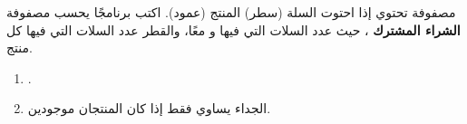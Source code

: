 \begin{statement}
مصفوفة  تحتوي  إذا احتوت السلة (سطر) المنتج (عمود). اكتب برنامجًا يحسب مصفوفة \textbf{الشراء المشترك} ، حيث  عدد السلات التي فيها  و معًا، والقطر عدد السلات التي فيها كل منتج.
\end{statement}
\begin{stepsbox}\begin{enumerate}
\item \par{\centering\small{}\par}.
\item الجداء يساوي  فقط إذا كان المنتجان موجودين.
\end{enumerate}\end{stepsbox}
